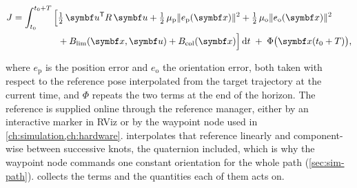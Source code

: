 \begin{equation}
  \begin{aligned}
    J = \int_{t_0}^{t_0+T} \Big[
        &\tfrac{1}{2}\, \uvec^{\mathsf{T}} R\, \uvec
      + \tfrac{1}{2}\, \mu_\mathrm{p} \lVert e_\mathrm{p}(\svec) \rVert^2
      + \tfrac{1}{2}\, \mu_\mathrm{o} \lVert e_\mathrm{o}(\svec) \rVert^2 \\
      &+ B_\mathrm{lim}(\svec, \uvec) + B_\mathrm{col}(\svec)
      \Big]\, \mathrm{d}t
      \;+\; \Phi\big(\svec(t_0+T)\big) ,
  \end{aligned}
  \label{eq:cost}
\end{equation}

where $e_\mathrm{p}$ is the \ee{} position error and $e_\mathrm{o}$ the
orientation error, both taken with respect to the reference pose
interpolated from the target trajectory at the current time, and $\Phi$
repeats the two \ee{} terms at the end of the horizon. The reference is
supplied online through the \ocs{} reference manager, either by an
interactive marker in RViz or by the waypoint node used in
\cref{ch:simulation,ch:hardware}. \ocs{} interpolates that reference
linearly and component-wise between successive knots, the quaternion
included, which is why the waypoint node commands one constant
orientation for the whole path (\cref{sec:sim-path}).
 collects the terms and the quantities each of
them acts on.

